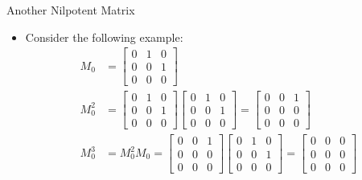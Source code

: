 \documentclass[usenames,dvipsnames,10pt]{beamer}
\begin{document}
\begin{frame}
  {Another Nilpotent Matrix}

  \begin{itemize}
  \item Consider the following example:
    \begin{align*}
      M_0 &=
            \begin{bmatrix}
              0 & 1 & 0 \\ 0 & 0 & 1 \\ 0 & 0 & 0
            \end{bmatrix}\\
      M_0^2 &= 
              \begin{bmatrix}
                0 & 1 & 0 \\ 0 & 0 & 1 \\ 0 & 0 & 0
              \end{bmatrix}
              \begin{bmatrix}
                0 & 1 & 0 \\ 0 & 0 & 1 \\ 0 & 0 & 0
              \end{bmatrix}
              =
              \begin{bmatrix}
                0 & 0 & 1 \\ 0 & 0 & 0 \\ 0 & 0 & 0
              \end{bmatrix}\\
      M_0^3 &= M_0^2M_0 =
              \begin{bmatrix}
                0 & 0 & 1 \\ 0 & 0 & 0 \\ 0 & 0 & 0
              \end{bmatrix}
              \begin{bmatrix}
                0 & 1 & 0 \\ 0 & 0 & 1 \\ 0 & 0 & 0
              \end{bmatrix}
              =
              \begin{bmatrix}
                0 & 0 & 0 \\ 0 & 0 & 0 \\ 0 & 0 & 0
              \end{bmatrix}
    \end{align*}
  \end{itemize}
\end{frame}
\end{document}
